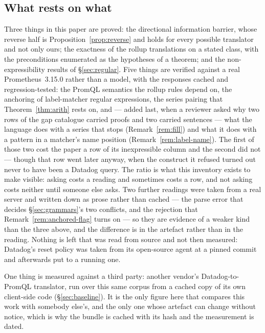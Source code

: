 \subsection{What rests on what}
\label{app:evidence}

Three things in this paper are proved: the directional information barrier, whose
reverse half is Proposition~\ref{prop:reverse} and holds for every possible translator
and not only ours; the exactness of the rollup translations on a
stated class, with the preconditions enumerated as the hypotheses of a theorem; and the
non-expressibility results of \S\ref{sec:regular}. Five things are verified against a
real Prometheus~3.15.0 rather than a model, with the responses cached and
regression-tested: the PromQL semantics the rollup rules depend on, the anchoring of
label-matcher regular expressions, the series pairing that
Theorem~\ref{thm:arith} rests on, and --- added last, when a reviewer asked why two rows
of the gap catalogue carried proofs and two carried sentences --- what the language does
with a series that stops (Remark~\ref{rem:fill}) and what it does with a pattern in a
matcher's name position (Remark~\ref{rem:label-name}). The first of those two cost the
paper a row of its inexpressible column and the second did not --- though that row went
later anyway, when the construct it refused turned out never to have been a Datadog
query. The ratio is what this inventory exists to make visible: asking costs a reading
and sometimes costs a row, and not asking costs neither until someone else asks. Two further readings were taken from a real server
and written down as prose rather than cached --- the parse error that decides
\S\ref{sec:grammars}'s two conflicts, and the rejection that
Remark~\ref{rem:anchored-flag} turns on --- so they are evidence of a weaker kind than
the three above, and the difference is in the artefact rather than in the reading.
Nothing is left that was read from source and not then measured: Datadog's reset policy was taken from its
open-source agent at a pinned commit and afterwards put to a running one.

One thing is measured against a third party: another vendor's Datadog-to-PromQL
translator, run over this same corpus from a cached copy of its own client-side code
(\S\ref{sec:baseline}). It is the only figure here that compares this work with
somebody else's, and the only one whose artefact can change without notice, which is why
the bundle is cached with its hash and the measurement is dated.


